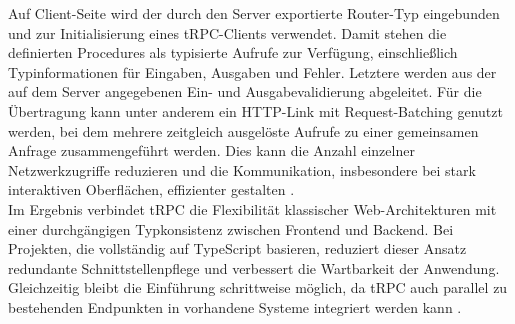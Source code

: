 Auf Client-Seite wird der durch den Server exportierte Router-Typ eingebunden und zur Initialisierung eines tRPC-Clients verwendet.
Damit stehen die definierten Procedures als typisierte Aufrufe zur Verfügung, einschließlich Typinformationen für Eingaben, Ausgaben und Fehler.
Letztere werden aus der auf dem Server angegebenen Ein- und Ausgabevalidierung abgeleitet.
Für die Übertragung kann unter anderem ein HTTP-Link mit Request-Batching genutzt werden, bei dem mehrere zeitgleich ausgelöste Aufrufe zu einer gemeinsamen Anfrage zusammengeführt werden.
Dies kann die Anzahl einzelner Netzwerkzugriffe reduzieren und die Kommunikation, insbesondere bei stark interaktiven Oberflächen, effizienter gestalten \cite{trpc2026documentation}. \\

Im Ergebnis verbindet tRPC die Flexibilität klassischer Web-Architekturen mit einer durchgängigen Typkonsistenz zwischen Frontend und Backend.
Bei Projekten, die vollständig auf TypeScript basieren, reduziert dieser Ansatz redundante Schnittstellenpflege und verbessert die Wartbarkeit der Anwendung.
Gleichzeitig bleibt die Einführung schrittweise möglich, da tRPC auch parallel zu bestehenden Endpunkten in vorhandene Systeme integriert werden kann \cite{trpc2026documentation}.